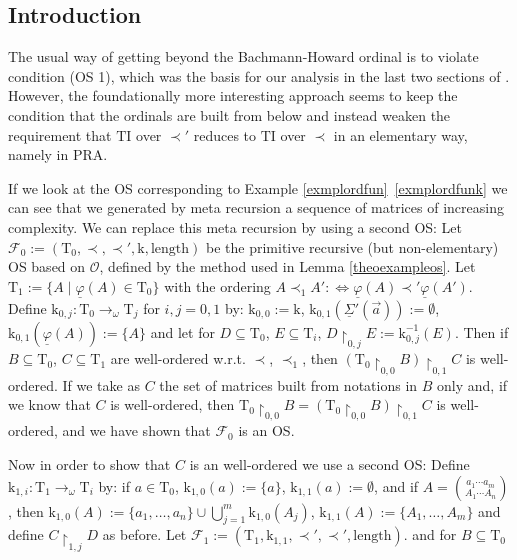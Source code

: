 \documentclass[10pt]{article}
\def \refcom#1#2{\ref{#1}\ \ref{#1#2}}%
\def\ar{\rightarrow}
\def \Iff{\Leftrightarrow}
\def \calO{{\mathcal O}}
\def\length{\mathrm{length}}
\def\k{\mathrm{k}}
\def\phibar{{\underline{\varphi}}}
\def\T{\mathrm{T}}
\def\TI{\mathrm{TI}}
\def\Sigmabar{\underline{\Sigma}}
\def\PRA{\mathrm{PRA}}
\def\calF{\mathcal{F}}
\def \avec{{\vec a}}
\begin{document}
\subsection{Introduction}
The usual way of getting beyond the Bachmann-Howard ordinal is to 
violate condition (OS 1), which was the basis for our analysis in
the last two sections of \cite{setzvenedig}. However, 
the foundationally more interesting 
approach seems to keep the condition that the ordinals are built
from below and instead weaken the requirement that 
$\TI$ over $\prec '$ 
reduces to $\TI$ over $\prec$ in an elementary way, namely in $\PRA$.\par 
If we look at the OS corresponding to 
Example \refcom{exmplordfun}k we can see that we generated
by meta recursion a sequence of matrices of increasing complexity.
We can replace this meta recursion by using a second OS:
Let $\calF_0:=(\T_0,\prec,\prec',\k,\length)$ be the 
primitive recursive (but non-elementary) OS based on 
$\calO$, defined by the method used in Lemma \ref{theoexampleos}.
Let $\T_1:= \{ A \mid \phibar(A) \in \T_0 \}$ with the ordering 
$A \prec_1 A' :\Iff  \phibar(A) \prec' \phibar(A')$.
Define $\k_{0,j}: \T_0 \ar_\omega \T_j$ for $i,j=0,1$ by:
$\k_{0,0}:= \k$, $\k_{0,1}(\Sigmabar'(\avec)):= \emptyset$,
$\k_{0,1}(\phibar(A)):= \{ A \}$ and let
for $D \subseteq \T_0$, $E \subseteq \T_i$, $D \restriction_{0,j}E:=
\k_{0,j}^{-1}(E)$. Then if $B \subseteq \T_0$,
$C \subseteq \T_1$ are well-ordered w.r.t. $\prec$, $\prec_1$, then
$(\T_0 \restriction_{0,0} B) \restriction_{0,1} C$
is well-ordered. If we take as $C$ the
set of matrices built from notations in $B$ only and, if we know
that $C$ is well-ordered, then $\T_0 \restriction_{0,0} B = 
(\T_0 \restriction_{0,0} B) \restriction_{0,1} C$ is well-ordered, and
we have shown that $\calF_0$ is an OS.\par
Now in order to show that $C$ is an well-ordered we use a second 
OS:
Define $\k_{1,i}: \T_1  \ar_\omega \T_i$ by: 
if $a \in \T_0$, $\k_{1,0}(a) := \{ a \}$,
$\k_{1,1}(a):= \emptyset$, and
if $A = 
{a_1 \cdots a_m \choose A_1 \cdots A_n}$, then
$\k_{1,0}(A):= \{ a_1 ,\ldots, a_n \} 
\cup \bigcup_{j=1}^m \k_{1,0}(A_j)$,
$\k_{1,1} (A):= \{ A_1 ,\ldots, A_m \}$ and define 
$C\restriction_{1,j}D$ as before.
Let $\calF_1:= (\T_1,\k_{1,1},\prec ',\prec ',\length)$.
and for  $B \subseteq \T_0$ 
\end{document}
